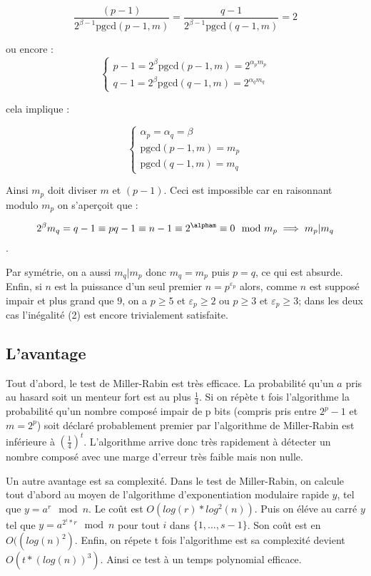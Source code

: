 $$\dfrac{(p-1)}{2^{\beta-1}\text{pgcd}(p-1,m)}=\dfrac{q-1}{2^{\beta-1}\text{pgcd}(q-1,m)}=2$$

ou encore :
$$
\left\{
    \begin{array}{ll}
        p-1=2^{\beta}\text{pgcd}(p-1,m)=2^{\alpha_p m_p}
        \\
        q-1=2^{\beta}\text{pgcd}(q-1,m)=2^{\alpha_q m_q}
    \end{array}
\right.
$$

cela implique :

$$
\left\{
    \begin{array}{ll}
        \alpha_p=\alpha_q=\beta
        \\
        \text{pgcd}(p-1,m)=m_p
        \\
        \text{pgcd}(q-1,m)=m_q
    \end{array}
\right.
$$

Ainsi $m_p$ doit diviser $m$ et $(p-1)$. Ceci est impossible car en raisonnant modulo $m_p$ on s'aperçoit que :

$$2^{\beta}m_q=q-1\equiv pq-1\equiv n-1 \equiv 2^\alpham \equiv 0 \mod m_p \implies m_p|m_q$$.

Par symétrie, on a aussi $m_q|m_p$ donc $m_q=m_p$ puis $p=q$, ce qui est absurde. Enfin, si $n$ est la puissance d'un seul premier $n=p^{\varepsilon_p}$ alors, comme $n$ est supposé impair et plus grand que $9$, on a $p\geq 5$ et $\varepsilon_p \geq 2$ ou $p\geq 3$ et $\varepsilon_p \geq3$; dans les deux cas l'inégalité (2) est encore trivialement satisfaite.

\clearpage
\subsection{L'avantage}

Tout d'abord, le test de Miller-Rabin est très efficace. La probabilité qu'un $a$ pris au hasard soit un menteur fort est au plus $\frac{1}{4}$. Si on répète t fois l'algorithme la probabilité qu'un nombre composé impair de p bits (compris pris entre $2^p - 1$ et $m = 2^p$) soit déclaré probablement premier par l'algorithme de Miller-Rabin est inférieure à $\left(\frac{1}{4}\right)^{t}$.
L’algorithme arrive donc très rapidement à détecter un nombre composé avec une marge d’erreur très faible mais non nulle.

Un autre avantage est sa complexité. Dans le test de Miller-Rabin, on calcule tout d'abord au moyen de l'algorithme d'exponentiation modulaire rapide  $y$, tel que $y=a^{r} \mod n$. Le coût est  $O(log(r)*log^2(n))$. Puis on éléve au carré $y$ tel que $y= a^{2^{i}*r} \mod n $ pour tout $i$ dans $ \{1,...,s-1\} $. Son coût est en $O((log(n)^2)$. Enfin, on répete t fois l'algorithme est sa complexité devient $O(t*(log(n))^3)$. Ainsi ce test à un temps polynomial efficace.